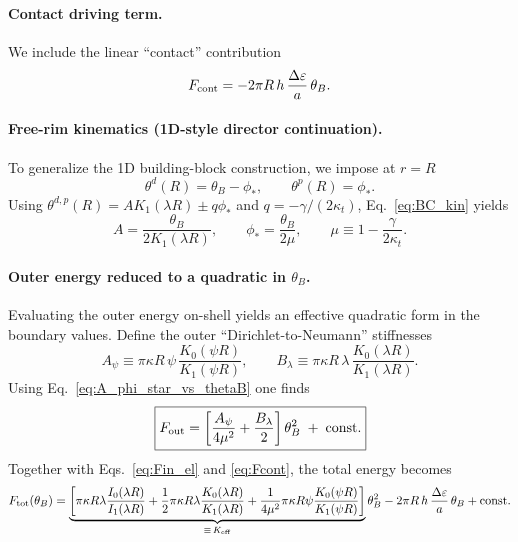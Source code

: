 \documentclass[11pt]{article}
\begin{document}
\paragraph{Contact driving term.}
We include the linear ``contact'' contribution
\begin{equation}
F_{\rm cont}=-2\pi R\,h\,\frac{\Delta\varepsilon}{a}\,\theta_B.
\label{eq:Fcont}
\end{equation}

\paragraph{Free-rim kinematics (1D-style director continuation).}
To generalize the 1D building-block construction, we impose at $r=R$
\begin{equation}
\boxed{
\theta^d(R)=\theta_B-\phi_*,
\qquad
\theta^p(R)=\phi_*
}.
\label{eq:BC_kin}
\end{equation}
Using $\theta^{d,p}(R)=A K_1(\lambda R)\pm q\phi_*$ and $q=-\gamma/(2\kappa_t)$,
Eq.~\eqref{eq:BC_kin} yields
\begin{equation}
\boxed{
A=\frac{\theta_B}{2K_1(\lambda R)},
\qquad
\phi_*=\frac{\theta_B}{2\mu},
\qquad
\mu\equiv 1-\frac{\gamma}{2\kappa_t}.
}
\label{eq:A_phi_star_vs_thetaB}
\end{equation}

\paragraph{Outer energy reduced to a quadratic in $\theta_B$.}
Evaluating the outer energy on-shell yields an effective quadratic form in the boundary values.
Define the outer ``Dirichlet-to-Neumann'' stiffnesses
\begin{equation}
A_\psi \equiv \pi\kappa R\,\psi\,\frac{K_0(\psi R)}{K_1(\psi R)},
\qquad
B_\lambda \equiv \pi\kappa R\,\lambda\,\frac{K_0(\lambda R)}{K_1(\lambda R)}.
\end{equation}
Using Eq.~\eqref{eq:A_phi_star_vs_thetaB} one finds
\begin{equation}
\boxed{
F_{\rm out}
=\left[
\frac{A_\psi}{4\mu^2}+\frac{B_\lambda}{2}
\right]\theta_B^2
\;+\;\text{const}.
}
\label{eq:Fout_reduced_thetaB}
\end{equation}
Together with Eqs.~\eqref{eq:Fin_el} and \eqref{eq:Fcont}, the total energy becomes
\begin{equation}
F_{\rm tot}(\theta_B)
=
\underbrace{\left[
\pi\kappa R\lambda\frac{I_0(\lambda R)}{I_1(\lambda R)}
+\frac{1}{2}\pi\kappa R\lambda\frac{K_0(\lambda R)}{K_1(\lambda R)}
+\frac{1}{4\mu^2}\pi\kappa R\psi\frac{K_0(\psi R)}{K_1(\psi R)}
\right]}_{\equiv\,K_{\rm eff}}
\theta_B^2
-2\pi R\,h\,\frac{\Delta\varepsilon}{a}\,\theta_B
+\text{const}.
\end{equation}
\end{document}
